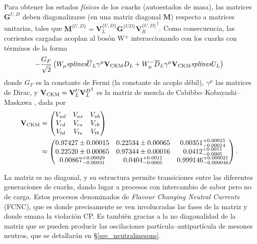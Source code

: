 Para obtener los estados \emph{físicos} de los cuarks (autoestados de masa), las matrices $\mathbf{G}^{U,D}$ deben diagonalizarse (en una matriz diagonal $\mathbf{M}$) respecto a matrices unitarias, tales que $\mathbf{M}^{\{U,D\}}=\mathbf{V}_L^{\{U,D\}} \mathbf{G}^{\{UD\}} {\mathbf{V}_R^{\{U,D\}}}^{\dagger}$.
%
Como consecuencia, las corrientes cargadas acoplan al bosón $\mathrm{W^{\pm}}$ interaccionando con los cuarks con términos de la forma
\begin{equation}
	-\frac{G_F}{\sqrt{2}} \left( W_{\mu}\emph{splines} \overline{U}_L \gamma^{\mu}  \mathbf{V}_{\text{CKM}} D_L + W_{\mu}^- \overline{D}_L \gamma^{\mu}  \mathbf{V}_{\text{CKM}}\emph{splines} U_L \right)
\end{equation}
donde $G_F$ es la constante de Fermi (la constante de acoplo débil), $\gamma^{\mu}$ las matrices de Dirac, y $\mathbf{V}_{\text{CKM}}= \mathbf{V}_L^U {\mathbf{V}_L^D}^{\dagger}$ es la matriz de mezcla de Cabibbo--Kobayashi--Maskawa \cite{pdg2018}, dada por \color{new}
\begin{align}
  \mathbf{V}_{\text{CKM}}  &= \begin{pmatrix}
	V_{ud} & V_{us} & V_{ub} \\
	V_{cd} & V_{cs} & V_{cb} \\
	V_{td} & V_{ts} & V_{tb} \\
\end{pmatrix} \\ & \approx \begin{pmatrix}
0.97427 \pm 0.00015 & 0.22534 \pm 0.00065 & 0.00351^{+0.00015}_{-0.00014} \\
0.22520 \pm 0.00065 & 0.97344 \pm 0.00016 & 0.0412^{+0.0011}_{-0.0005} \\
0.00867^{+0.00029}_{-0.00031} & 0.0404^{+0.0011}_{-0.0005} & 0.999146^{+0.000021}_{-0.000046}
\end{pmatrix}. \nonumber
\end{align}

La matriz es no diagonal, y su estructura permite transiciones entre las diferentes generaciones de cuarks, dando lugar a procesos con intercambio de sabor pero no de carga. Estos procesos denominados de \textit{Flavour Changing Neutral Currents} (FCNC), que es donde precisamente se ven involucradas las fases de la matriz y donde emana la violación CP. Es también gracias a la no diagonalidad de la matriz que se pueden producir las oscilaciones partícula--antipartícula de mesones neutros, que se detallarán en \S \ref{sec_neutralmesons}.



